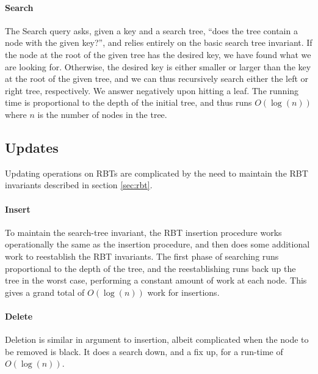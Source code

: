 \documentclass[a4paper, 12pt]{article}
\begin{document}
\paragraph{Search} The Search query asks, given a key and a search
tree, ``does the tree contain a node with the given key?'', and relies
entirely on the basic search tree invariant. If the node at the root
of the given tree has the desired key, we have found what we are
looking for. Otherwise, the desired key is either smaller or larger
than the key at the root of the given tree, and we can thus
recursively search either the left or right tree, respectively. We
answer negatively upon hitting a leaf. The running time is
proportional to the depth of the initial tree, and thus runs
$O(\log(n))$ where $n$ is the number of nodes in the tree.

\subsection{Updates}

Updating operations on RBTs are complicated by the need to maintain
the RBT invariants described in section \ref{sec:rbt}.

\paragraph{Insert} To maintain the search-tree invariant, the
RBT insertion procedure works operationally the same as the insertion
procedure, and then does some additional work to reestablish the RBT
invariants. The first phase of searching runs proportional to the
depth of the tree, and the reestablishing runs back up the tree in the
worst case, performing a constant amount of work at each node. This
gives a grand total of $O(\log(n))$ work for insertions.

\paragraph{Delete} Deletion is similar in argument to insertion,
albeit complicated when the node to be removed is black. It does a
search down, and a fix up, for a run-time of $O(\log(n))$.
\end{document}
